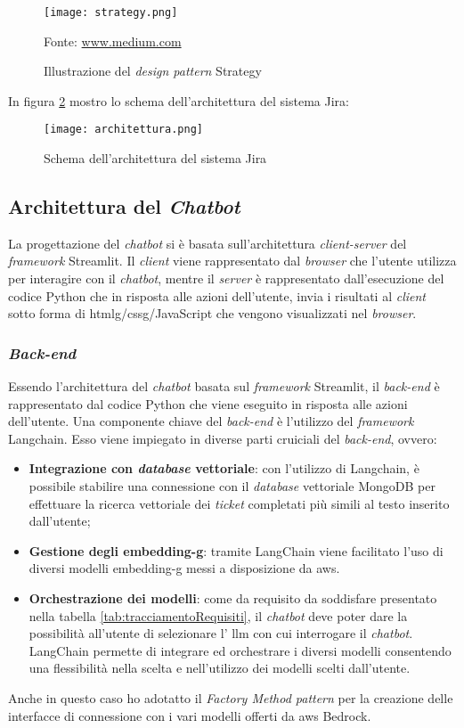 \begin{figure}[H]
    \centering
    \texttt{[image: strategy.png]}
    \caption{Illustrazione del \textit{design pattern} Strategy}
    \small Fonte: \href{https://medium.com/litslink/design-patterns-strategy-in-examples-eae7bf10a817} {www.medium.com}
    \label{fig:strategy}
\end{figure}

\noindent
In figura \ref{fig:architetturaJira} mostro lo schema dell'architettura del sistema Jira:
\begin{figure}[H]
    \centering
    \texttt{[image: architettura.png]}
    \caption{Schema dell'architettura del sistema Jira}
    \label{fig:architetturaJira}
\end{figure}

\subsection{Architettura del \textit{Chatbot}}
La progettazione del \textit{chatbot} si è basata sull'architettura \textit{client-server} del \textit{framework} Streamlit. Il \textit{client} viene rappresentato dal \textit{browser} che l'utente utilizza per interagire con il \textit{chatbot}, mentre il \textit{server} è rappresentato dall'esecuzione del codice Python che in risposta alle azioni dell'utente, invia i risultati al \textit{client} sotto forma di \gls{htmlg}/\gls{cssg}/JavaScript che vengono visualizzati nel \textit{browser}.
\subsubsection{\textit{Back-end}}
Essendo l'architettura del \textit{chatbot} basata sul \textit{framework} Streamlit, il \textit{back-end} è rappresentato dal codice Python che viene eseguito in risposta alle azioni dell'utente.
Una componente chiave del \textit{back-end} è l'utilizzo del \textit{framework} Langchain. Esso viene impiegato in diverse parti cruiciali del \textit{back-end}, ovvero:
\begin{itemize}
    \item \textbf{Integrazione con \textit{database} vettoriale}: con l'utilizzo di Langchain, è possibile stabilire una connessione con il \textit{database} vettoriale MongoDB per effettuare la ricerca vettoriale dei \textit{ticket} completati più simili al testo inserito dall'utente;
    \item \textbf{Gestione degli \gls{embedding-g}}: tramite LangChain viene facilitato l'uso di diversi modelli \gls{embedding-g} messi a disposizione da \gls{aws}. 
    \item \textbf{Orchestrazione dei modelli}: come da requisito da soddisfare presentato nella tabella \ref{tab:tracciamentoRequisiti}, il \textit{chatbot} deve poter dare la possibilità all'utente di selezionare l' \gls{llm} con cui interrogare il \textit{chatbot}. LangChain permette di integrare ed orchestrare i diversi modelli consentendo una flessibilità nella scelta e nell'utilizzo dei modelli scelti dall'utente.
\end{itemize} 
\noindent
Anche in questo caso ho adotatto il \textit{Factory Method pattern} per la creazione delle interfacce di connessione con i vari modelli offerti da \gls{aws} Bedrock. 
